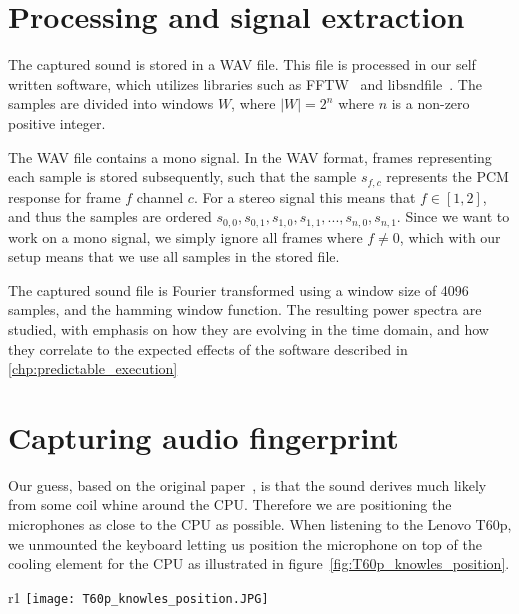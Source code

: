 \section{Processing and signal extraction}\label{ch3:sec:processing_signal_extraction}

The captured sound is stored in a WAV file.
This file is processed in our self written software, which utilizes libraries such as FFTW~\cite{url:fftw} and libsndfile~\cite{url:libsndfile}.
The samples are divided into windows \( W \), where \( \lvert W \rvert = 2^{n} \) where \( n \) is a non-zero positive integer.

The WAV file contains a mono signal. In the WAV format, frames representing each sample is stored subsequently, such that the sample \( s_{f,c} \) represents the \gls{PCM} response for frame \( f \) channel \( c \). 
For a stereo signal this means that \( f \in \left [ 1, 2 \right ]  \), and thus the samples are ordered  \( s_{0,0}, s_{0,1}, s_{1,0}, s_{1,1}, ... , s_{n,0}, s_{n,1} \). 
Since we want to work on a mono signal, we simply ignore all frames where \( f \neq 0 \), which with our setup means that we use all samples in the stored file.

The captured sound file is Fourier transformed using a window size of 4096 samples, and the hamming window function. The resulting power spectra are studied, with emphasis on how they are evolving in the time domain, and how they correlate to the expected effects of the software described in \autoref{chp:predictable_execution}

\section{Capturing audio fingerprint}\label{ch3:sec:capturing_audio_fingerprint}

Our guess, based on the original paper~\cite{DBLP:conf/crypto/GenkinST14}, is that the sound derives much likely from some coil whine around the CPU. 
Therefore we are positioning the microphones as close to the CPU as possible. 
When listening to the Lenovo T60p, we unmounted the keyboard letting us position the microphone on top of the cooling element for the CPU as illustrated in figure~\ref{fig:T60p_knowles_position}. 

\begin{wrapfigure}{r}{1\textwidth}
  \centering
  \texttt{[image: T60p\_knowles\_position.JPG]}
  \caption{Microphone position while recording the CPU of the Lenovo T60p, using the Knowles Ultrasonic SPU0410LR5H~\cite{url:knowles_spec}.}
  \label{fig:T60p_knowles_position}
\end{wrapfigure}

